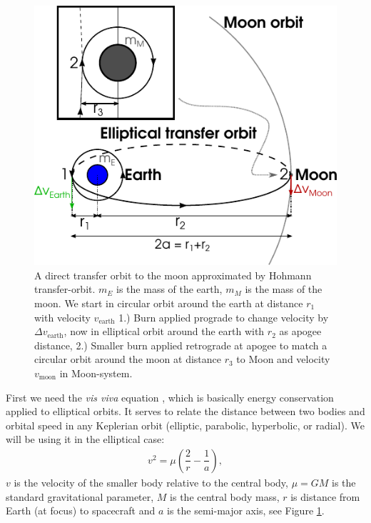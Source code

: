 \begin{figure}[ht!]
\centering
\includegraphics[scale=1.4]{fig/hohmann_moon.pdf}
\caption{A direct transfer orbit to the moon approximated by Hohmann transfer-orbit. $m_E$ is the mass of the earth, $m_M$ is the mass of the moon. We start in circular orbit around the earth at distance $r_1$ with velocity $v_{\text{earth}}$ 1.) Burn applied prograde to change velocity by $\Delta v_{\text{earth}}$, now in elliptical orbit around the earth with $r_2$ as apogee distance, 2.) Smaller burn applied retrograde at apogee to match a circular orbit around the moon at distance $r_3$ to Moon and velocity $v_{\text{moon}}$ in Moon-system.}
\label{fig:hohmann-moon}
\end{figure}

First we need the \emph{vis viva} equation \cite{Pisacane2005}, which is basically energy conservation applied to elliptical orbits. It serves to relate the distance between two bodies and orbital speed in any Keplerian orbit (elliptic, parabolic, hyperbolic, or radial). We will be using it in the elliptical case:
\begin{align}
v^2 = \mu \left(\dfrac{2}{r} - \dfrac{1}{a} \right) \label{eq:vis-viva} ,
\end{align}
$v$ is the velocity of the smaller body relative to the central body, $\mu=G M$ is the standard gravitational parameter, $M$ is the central body mass, $r$ is distance from Earth (at focus) to spacecraft and $a$ is the semi-major axis, see Figure \ref{fig:hohmann-moon}.

